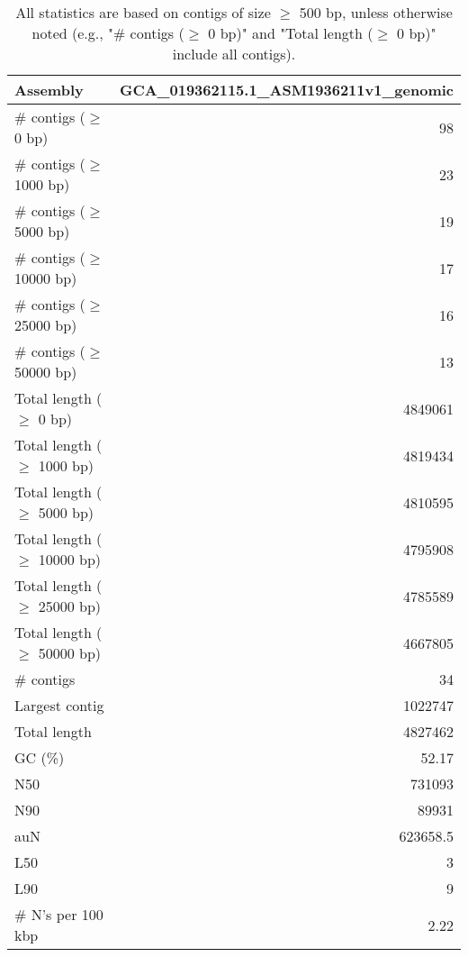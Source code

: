 \documentclass[12pt,a4paper]{article}
\begin{document}
\begin{table}[ht]
\begin{center}
\caption{All statistics are based on contigs of size $\geq$ 500 bp, unless otherwise noted (e.g., "\# contigs ($\geq$ 0 bp)" and "Total length ($\geq$ 0 bp)" include all contigs).}
\begin{tabular}{|l*{1}{|r}|}
\hline
Assembly & GCA\_019362115.1\_ASM1936211v1\_genomic \\ \hline
\# contigs ($\geq$ 0 bp) & 98 \\ \hline
\# contigs ($\geq$ 1000 bp) & 23 \\ \hline
\# contigs ($\geq$ 5000 bp) & 19 \\ \hline
\# contigs ($\geq$ 10000 bp) & 17 \\ \hline
\# contigs ($\geq$ 25000 bp) & 16 \\ \hline
\# contigs ($\geq$ 50000 bp) & 13 \\ \hline
Total length ($\geq$ 0 bp) & 4849061 \\ \hline
Total length ($\geq$ 1000 bp) & 4819434 \\ \hline
Total length ($\geq$ 5000 bp) & 4810595 \\ \hline
Total length ($\geq$ 10000 bp) & 4795908 \\ \hline
Total length ($\geq$ 25000 bp) & 4785589 \\ \hline
Total length ($\geq$ 50000 bp) & 4667805 \\ \hline
\# contigs & 34 \\ \hline
Largest contig & 1022747 \\ \hline
Total length & 4827462 \\ \hline
GC (\%) & 52.17 \\ \hline
N50 & 731093 \\ \hline
N90 & 89931 \\ \hline
auN & 623658.5 \\ \hline
L50 & 3 \\ \hline
L90 & 9 \\ \hline
\# N's per 100 kbp & 2.22 \\ \hline
\end{tabular}
\end{center}
\end{table}
\end{document}
